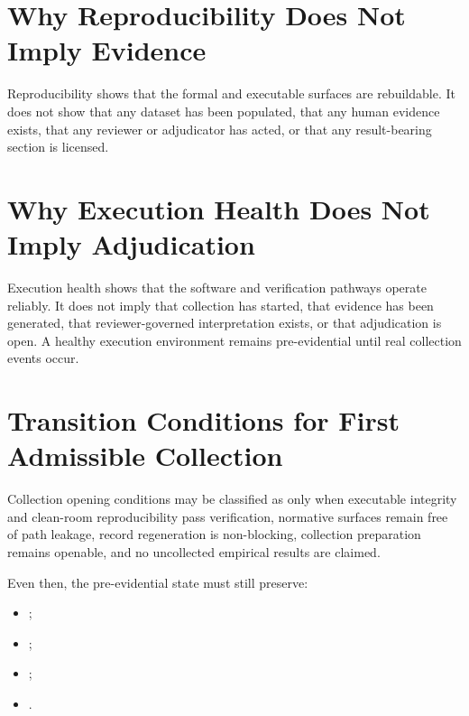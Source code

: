 \documentclass[11pt,a4paper]{article}
\begin{document}
\section{Why Reproducibility Does Not Imply Evidence}

Reproducibility shows that the formal and executable surfaces are rebuildable.
It does not show that any dataset has been populated, that any human evidence
exists, that any reviewer or adjudicator has acted, or that any result-bearing
section is licensed.

\section{Why Execution Health Does Not Imply Adjudication}

Execution health shows that the software and verification pathways operate reliably.
It does not imply that collection has started, that evidence has been generated,
that reviewer-governed interpretation exists, or that adjudication is open. A
healthy execution environment remains pre-evidential until real collection events
occur.

\section{Transition Conditions for First Admissible Collection}

Collection opening conditions may be classified as \texttt{\allowbreak{}\allowbreak{}\allowbreak{}}
only when executable integrity and clean-room reproducibility pass verification,
normative surfaces remain free of path leakage, record regeneration is
non-blocking, collection preparation remains openable, and no uncollected empirical results are
claimed.

Even then, the pre-evidential state must still preserve:

\begin{itemize}
\item \texttt{\allowbreak{}\allowbreak{}\allowbreak{}\allowbreak{}};
\item \texttt{\allowbreak{}\allowbreak{}\allowbreak{}};
\item \texttt{\allowbreak{}\allowbreak{}\allowbreak{}};
\item \texttt{\allowbreak{}\allowbreak{}}.
\end{itemize}
\end{document}
